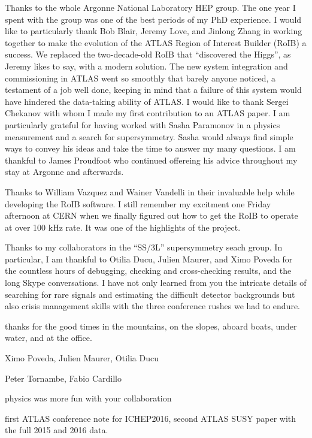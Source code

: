 Thanks to the whole Argonne National Laboratory HEP group. The one year I spent with the group was one of the  best periods of my PhD experience.
I would like to particularly thank Bob Blair, Jeremy Love, and Jinlong Zhang in working together to make the evolution of the ATLAS 
Region of Interest Builder (RoIB) a success. 
We replaced the two-decade-old RoIB that ``discovered the Higgs'', as Jeremy likes to say, with a modern solution.
The new system integration and commissioning in ATLAS went so smoothly that barely anyone noticed, a testament of a job well done,
keeping in mind that a failure of this system would have hindered the data-taking ability of ATLAS.
I would like to thank Sergei Chekanov with whom I made my first contribution to an ATLAS paper.
I am particularly grateful for having worked with Sasha Paramonov in a physics measurement and a search for supersymmetry. 
Sasha would always find simple ways to convey his ideas and take the time to answer my many questions. 
I am thankful to James Proudfoot who continued offereing his advice throughout my stay at Argonne and afterwards.

Thanks to William Vazquez and Wainer Vandelli in their invaluable help while developing the RoIB software.
I still remember my excitment one Friday afternoon at CERN when we finally figured out how to get the RoIB to operate at 
over 100 kHz rate. It was one of the highlights of the project.

Thanks to my collaborators in the ``SS/3L'' supersymmetry seach group. In particular, I am thankful to 
Otilia Ducu, Julien Maurer, and Ximo Poveda for the countless hours of debugging, checking and cross-checking results, and the 
long Skype conversations. I have not only learned from you the intricate details of searching for rare signals and estimating 
the difficult detector backgrounds but also crisis management skills with the three conference rushes we had to endure. 


thanks for the good times in the mountains, on the slopes, aboard boats, under water, and at the office.


Ximo Poveda, Julien Maurer, Otilia Ducu

Peter Tornambe, Fabio Cardillo

physics was more fun with your collaboration

first ATLAS conference note for ICHEP2016, second ATLAS SUSY paper with the full 2015 and 2016 data.

